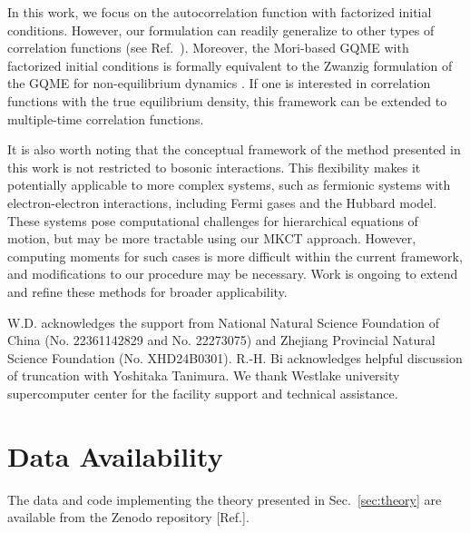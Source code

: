 \documentclass[preprint,aip,jcp]{revtex4-2}
\begin{document}
In this work, we focus on the autocorrelation function with factorized initial conditions. However, our formulation can readily generalize to other types of correlation functions (see Ref.~\cite{liu2024mkct}). Moreover, the Mori-based GQME with factorized initial conditions is formally equivalent to the Zwanzig formulation of the GQME for non-equilibrium dynamics \cite{kelly_generalized_2016,montoya-castillo_approximate_2016}. If one is interested in correlation functions with the true equilibrium density, this framework can be extended to multiple-time correlation functions.

It is also worth noting that the conceptual framework of the method presented in this work is not restricted to bosonic interactions. This flexibility makes it potentially applicable to more complex systems, such as fermionic systems with electron-electron interactions, including Fermi gases and the Hubbard model. These systems pose computational challenges for hierarchical equations of motion, but may be more tractable using our MKCT approach. However, computing moments for such cases is more difficult within the current framework, and modifications to our procedure may be necessary. Work is ongoing to extend and refine these methods for broader applicability.


\begin{acknowledgments}
W.D. acknowledges the support from National Natural Science Foundation of China (No. 22361142829 and No. 22273075) and Zhejiang Provincial Natural Science Foundation (No. XHD24B0301).  R.-H. Bi acknowledges helpful discussion of truncation with Yoshitaka Tanimura. We thank Westlake university supercomputer center for the facility support and technical assistance.
\end{acknowledgments}

\section*{Data Availability}
The data and code implementing the theory presented in Sec.~\ref{sec:theory} are available from the Zenodo repository [Ref.]. 


\appendix
\end{document}
